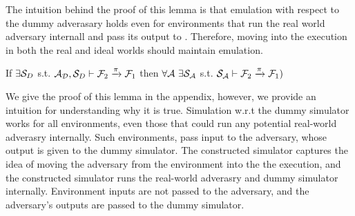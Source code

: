 The intuition behind the proof of this lemma is that emulation with respect to the dummy adverasary holds even for environments that run the real world adversary internall and pass its output to \DS. 
Therefore, moving \A into the execution in both the real and ideal worlds should maintain emulation.

\begin{theorem}\label{thm:dummy}
If $\exists \mathcal{S}_{D}$ s.t. $ \mathcal{A}_\mathcal{D}, \mathcal{S}_{D} \vdash \mathcal{F}_2 \xrightarrow{\pi} \mathcal{F}_1$ then $\forall \mathcal{A} \ \exists \mathcal{S}_\mathcal{A}$ s.t. $\mathcal{S}_{\mathcal{A}} \vdash  \mathcal{F}_2 \xrightarrow{\pi} \mathcal{F}_1)$ 
\end{theorem}

We give the proof of this lemma in the appendix, however, we provide an intuition for understanding why it is true.
Simulation w.r.t the dummy simulator works for all environments, even those that could run any potential real-world adverasry internally. Such environments, pass input to the adversary, whose output is given to the dummy simulator. 
The constructed simulator captures the idea of moving the adversary from the environment into the the execution, and the constructed simulator runs the real-world adverasry and dummy simulator internally.
Environment inputs are not passed to the adversary, and the adversary's outputs are passed to the dummy simulator.

